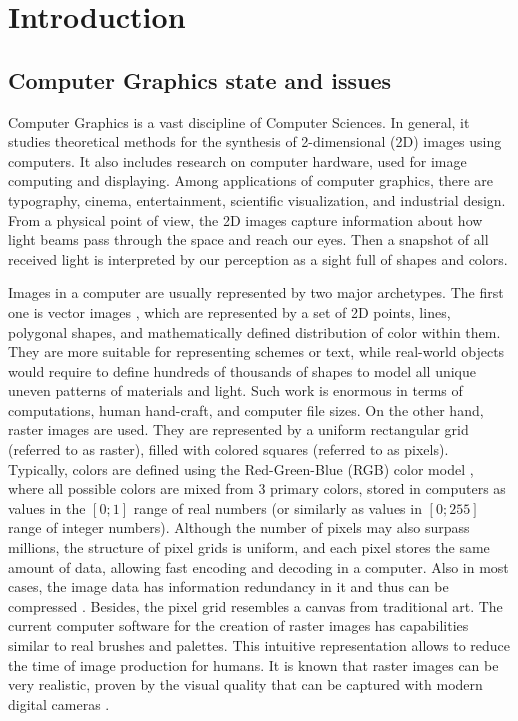 \chapter{Introduction}\label{chapter:intro}

\section{Computer Graphics state and issues}\label{intro:cg}

Computer Graphics is a vast discipline of Computer Sciences. In general, it studies theoretical methods for the synthesis of 2-dimensional (2D) images using computers. It also includes research on computer hardware, used for image computing and displaying. Among applications of computer graphics, there are typography, cinema, entertainment, scientific visualization, and industrial design. From a physical point of view, the 2D images capture information about how light beams pass through the space and reach our eyes. Then a snapshot of all received light is interpreted by our perception as a sight full of shapes and colors. 

Images in a computer are usually represented by two major archetypes. The first one is vector images \cite{aux:vector14}, which are represented by a set of 2D points, lines, polygonal shapes, and mathematically defined distribution of color within them. They are more suitable for representing schemes or text, while real-world objects would require to define hundreds of thousands of shapes to model all unique uneven patterns of materials and light. Such work is enormous in terms of computations, human hand-craft, and computer file sizes. On the other hand, raster images \cite{aux:raster94} are used. They are represented by a uniform rectangular grid (referred to as raster), filled with colored squares (referred to as pixels). Typically, colors are defined using the Red-Green-Blue (RGB) color model \cite{aux:color05}, where all possible colors are mixed from 3 primary colors, stored in computers as values in the $[0;1]$ range of real numbers (or similarly as values in $[0;255]$ range of integer numbers). Although the number of pixels may also surpass millions, the structure of pixel grids is uniform, and each pixel stores the same amount of data, allowing fast encoding and decoding in a computer. Also in most cases, the image data has information redundancy in it and thus can be compressed \cite{aux:compression18}. Besides, the pixel grid resembles a canvas from traditional art. The current computer software for the creation of raster images has capabilities similar to real brushes and palettes. This intuitive representation allows to reduce the time of image production for humans. It is known that raster images can be very realistic, proven by the visual quality that can be captured with modern digital cameras \cite{aux:camera21}.


